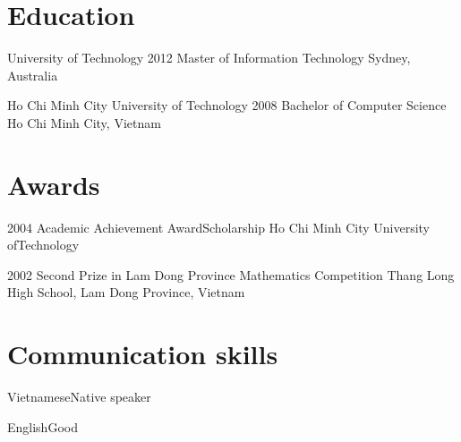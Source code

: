 \documentclass{tccv}
\begin{document}
\section{Education}

\begin{yearlist}

\item[University of Technology]{2012}
    {Master of Information Technology}
    {Sydney, Australia}

\item[Ho Chi Minh City University of Technology]{2008}
    {Bachelor of Computer Science}
    {Ho Chi Minh City, Vietnam}

\end{yearlist}

\section{Awards}

\begin{yearlist}

\item{2004}
    {Academic Achievement Award\newline Scholarship}
    {Ho Chi Minh City University of\newline Technology}

\item{2002}
    {Second Prize in Lam Dong Province Mathematics Competition}
    {Thang Long High School, Lam Dong Province, Vietnam}

\end{yearlist}

\section{Communication skills}

\begin{factlist}
\item{Vietnamese}{Native speaker}
\item{English}{Good}
\end{factlist}
\end{document}
